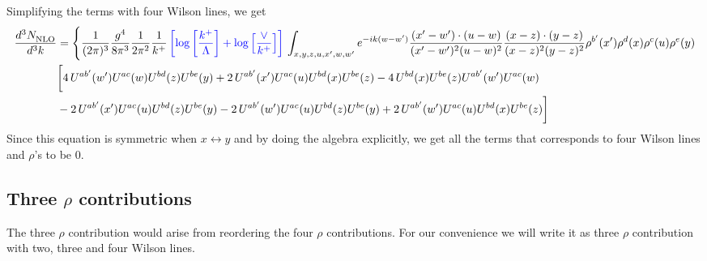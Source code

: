 \documentclass[aps,prd,amsmath,amssymb,nofootinbib]{revtex4-2}
\numberwithin{equation}{section}
\begin{document}
Simplifying the terms with four Wilson lines, we get
\begin{align}
       \frac{d^{3}N_{\rm NLO}^{\rm}}{d^{3}k}  & =  \Bigg\{\frac{1}{(2\pi)^{3}}\frac{g^{4}}{8\pi^{3}}\frac{1}{2\pi^{2}} \frac{1}{k^{+}}\,{\color{blue}\left[\log{\left[\frac{k^{+}}{\Lambda}\right]}+\log{\left[\frac{\vee}{k^{+}}\right]}\right]}\,\int_{x,y,z,u,x^{\prime},w,w^{\prime}}e^{-ik(w-w^{\prime})}\frac{(x^{\prime}-w^{\prime})\cdot (u-w)}{(x^{\prime}-w^{\prime})^{2} (u-w)^{2}} \frac{(x-z)\cdot (y-z)}{(x-z)^{2}(y-z)^{2}}\rho^{b'}(x') \rho^{d}(x) \rho^{c}(u) \rho^{e}(y)\notag \\ & \bigg[4\,U^{ab'}(w')U^{ac}(w)U^{bd}(z)U^{be}(y)+2\,U^{ab'}(x')U^{ac}(u)U^{bd}(x)U^{be}(z)-4\,U^{bd}(x)U^{be}(z)U^{ab'}(w')U^{ac}(w)\notag \\ & -2\,U^{ab'}(x')U^{ac}(u)U^{bd}(z)U^{be}(y)-2\,U^{ab'}(w')U^{ac}(u)U^{bd}(z)U^{be}(y)+2\,U^{ab'}(w')U^{ac}(u)U^{bd}(x)U^{be}(z)\bigg]
\end{align}
Since this equation is symmetric when $x\leftrightarrow y$ and by doing the algebra explicitly, we get all the terms that corresponds to four Wilson lines and $\rho$'s to be $0$.
\subsection{Three $\rho$ contributions }
The three $\rho$ contribution would arise from reordering the four $\rho$ contributions. For our convenience we will write it as three $\rho$ contribution with two, three and four Wilson lines. 
\end{document}
